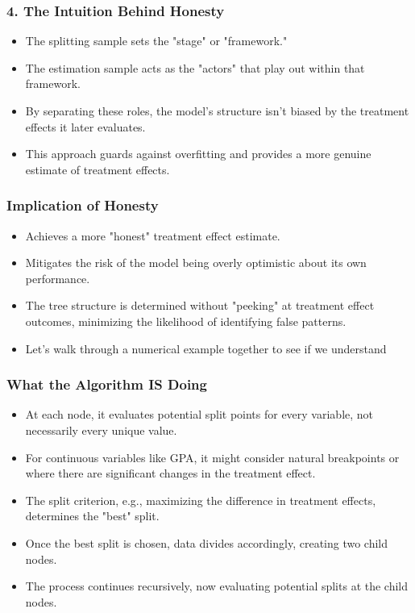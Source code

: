 \documentclass{beamer}
\begin{document}
\begin{frame}
\frametitle{4. The Intuition Behind Honesty}
\begin{itemize}
    \item The splitting sample sets the "stage" or "framework."
    \item The estimation sample acts as the "actors" that play out within that framework.
    \item By separating these roles, the model's structure isn't biased by the treatment effects it later evaluates.
    \item This approach guards against overfitting and provides a more genuine estimate of treatment effects.
\end{itemize}
\end{frame}

\begin{frame}
\frametitle{Implication of Honesty}
\begin{itemize}
    \item Achieves a more "honest" treatment effect estimate.
    \item Mitigates the risk of the model being overly optimistic about its own performance.
    \item The tree structure is determined without "peeking" at treatment effect outcomes, minimizing the likelihood of identifying false patterns.
    \item Let's walk through a numerical example together to see if we understand
\end{itemize}
\end{frame}

\begin{frame}
\frametitle{What the Algorithm IS Doing}
\begin{itemize}
    \item At each node, it evaluates potential split points for every variable, not necessarily every unique value.
    \item For continuous variables like GPA, it might consider natural breakpoints or where there are significant changes in the treatment effect.
    \item The split criterion, e.g., maximizing the difference in treatment effects, determines the "best" split.
    \item Once the best split is chosen, data divides accordingly, creating two child nodes.
    \item The process continues recursively, now evaluating potential splits at the child nodes.
\end{itemize}
\end{frame}
\end{document}
